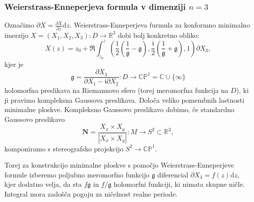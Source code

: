 \documentclass[8pt]{beamer}
\theoremstyle{definition}
\theoremstyle{remark}
\theoremstyle{plain}
\numberwithin{equation}{section}  %
\begin{document}
\begin{frame}
    \frametitle{Weierstrass-Enneperjeva formula v dimenziji $n=3$}

    Označimo $\partial X=\frac{\partial X}{\partial z} \mathrm{d} z$. Weierstrass-Enneperjeva furmula za konformno minimalno imerzijo $X=\left(X_1, X_2, X_3\right): D \rightarrow \mathbb{R}^3$ dobi bolj konkretno obliko:
    \begin{equation*}
        X(z)=z_0+\Re \int_{z_0}^z\left(\frac{1}{2}\left(\frac{1}{\mathfrak{g}}-\mathfrak{g}\right), \frac{\mathfrak{i}}{2}\left(\frac{1}{\mathfrak{g}}+\mathfrak{g}\right), 1\right) \partial X_3, 
    \end{equation*}
    kjer je 
    \begin{equation*}
        \mathfrak{g}=\frac{\partial X_3}{\partial X_1-\mathfrak{i} \partial X_2}: D \longrightarrow \mathbb{C P}^1 = \mathbb{C}\cup \{\infty \}
    \end{equation*}
    holomorfna preslikava na Riemannovo sfero (torej meromorfna funkcija na $D$), ki ji pravimo \textcolor{red1}{kompleksna Gaussova preslikava}. \pause Določa veliko pomembnih lastnosti minimalne ploskve. Kompleksno Gaussovo preslikavo dobimo, če standardno Gaussovo preslikavo 
    \begin{equation*}
        \mathbf{N}=\frac{X_x \times X_y}{\left|X_x \times X_y\right|}: M \rightarrow S^2 \subset \mathbb{R}^3,
    \end{equation*}
    komponiramo s stereografsko projekcijo $S^2 \rightarrow \mathbb{CP}^1$. 

    \vspace{0.8em}
    \pause 
    Torej za konstrukcijo minimalne ploskve s pomočjo Weierstrass-Enneperjeve formule izberemo poljubno meromorfno funkcijo $\mathfrak{g}$ diferencial $\partial X_3 = f(z) \mathrm{d}z$, kjer dodatno velja, da sta $f \mathfrak{g}$ in $f /\mathfrak{g}$ holomorfni funkciji, ki nimata skupne ničle. Integral mora zadošča pogoju za ničelnost realne periode. 

    
\end{frame}
\end{document}
